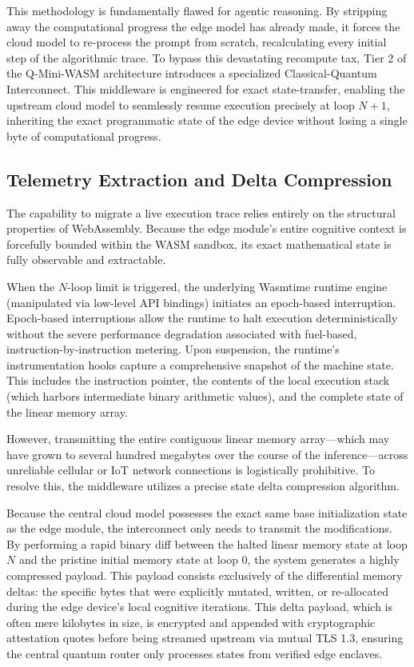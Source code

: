 \documentclass[11pt,a4paper]{article}
\begin{document}
This methodology is fundamentally flawed for agentic reasoning. By stripping away the computational progress the edge model has already made, it forces the cloud model to re-process the prompt from scratch, recalculating every initial step of the algorithmic trace. To bypass this devastating recompute tax, Tier 2 of the Q-Mini-WASM architecture introduces a specialized Classical-Quantum Interconnect. This middleware is engineered for exact state-transfer, enabling the upstream cloud model to seamlessly resume execution precisely at loop $N+1$, inheriting the exact programmatic state of the edge device without losing a single byte of computational progress.

\subsection{Telemetry Extraction and Delta Compression}

The capability to migrate a live execution trace relies entirely on the structural properties of WebAssembly. Because the edge module's entire cognitive context is forcefully bounded within the WASM sandbox, its exact mathematical state is fully observable and extractable.

When the $N$-loop limit is triggered, the underlying Wasmtime runtime engine (manipulated via low-level API bindings) initiates an epoch-based interruption. Epoch-based interruptions allow the runtime to halt execution deterministically without the severe performance degradation associated with fuel-based, instruction-by-instruction metering. Upon suspension, the runtime's instrumentation hooks capture a comprehensive snapshot of the machine state. This includes the instruction pointer, the contents of the local execution stack (which harbors intermediate binary arithmetic values), and the complete state of the linear memory array.

However, transmitting the entire contiguous linear memory array---which may have grown to several hundred megabytes over the course of the inference---across unreliable cellular or IoT network connections is logistically prohibitive. To resolve this, the middleware utilizes a precise state delta compression algorithm.

Because the central cloud model possesses the exact same base initialization state as the edge module, the interconnect only needs to transmit the modifications. By performing a rapid binary diff between the halted linear memory state at loop $N$ and the pristine initial memory state at loop $0$, the system generates a highly compressed payload. This payload consists exclusively of the differential memory deltas: the specific bytes that were explicitly mutated, written, or re-allocated during the edge device's local cognitive iterations. This delta payload, which is often mere kilobytes in size, is encrypted and appended with cryptographic attestation quotes before being streamed upstream via mutual TLS 1.3, ensuring the central quantum router only processes states from verified edge enclaves.
\end{document}
